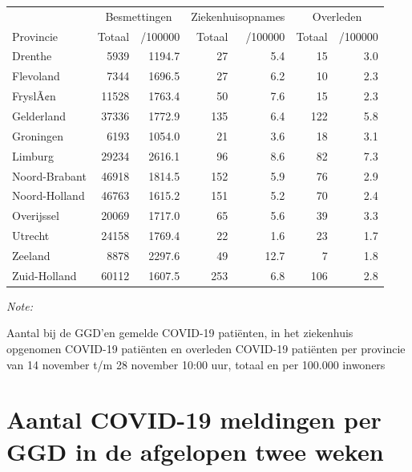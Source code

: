 \documentclass[
  english,
  man,floatsintext]{apa6}
\begin{document}
\begin{table}
\centering
\begin{threeparttable}
\begin{tabular}{lrrrrrr}
\toprule
\multicolumn{1}{c}{ } & \multicolumn{2}{c}{Besmettingen} & \multicolumn{2}{c}{Ziekenhuisopnames} & \multicolumn{2}{c}{Overleden} \\
\cmidrule(l{3pt}r{3pt}){2-3} \cmidrule(l{3pt}r{3pt}){4-5} \cmidrule(l{3pt}r{3pt}){6-7}
Provincie & Totaal & /100000 & Totaal & /100000 & Totaal & /100000\\
\midrule
Drenthe & 5939 & 1194.7 & 27 & 5.4 & 15 & 3.0\\
Flevoland & 7344 & 1696.5 & 27 & 6.2 & 10 & 2.3\\
FryslÃ¢n & 11528 & 1763.4 & 50 & 7.6 & 15 & 2.3\\
Gelderland & 37336 & 1772.9 & 135 & 6.4 & 122 & 5.8\\
Groningen & 6193 & 1054.0 & 21 & 3.6 & 18 & 3.1\\
Limburg & 29234 & 2616.1 & 96 & 8.6 & 82 & 7.3\\
Noord-Brabant & 46918 & 1814.5 & 152 & 5.9 & 76 & 2.9\\
Noord-Holland & 46763 & 1615.2 & 151 & 5.2 & 70 & 2.4\\
Overijssel & 20069 & 1717.0 & 65 & 5.6 & 39 & 3.3\\
Utrecht & 24158 & 1769.4 & 22 & 1.6 & 23 & 1.7\\
Zeeland & 8878 & 2297.6 & 49 & 12.7 & 7 & 1.8\\
Zuid-Holland & 60112 & 1607.5 & 253 & 6.8 & 106 & 2.8\\
\bottomrule
\end{tabular}
\begin{tablenotes}
\item \textit{Note: } 
\item Aantal bij de GGD’en gemelde COVID-19 patiënten, in het ziekenhuis opgenomen COVID-19 patiënten en overleden COVID-19 patiënten per provincie van 14 november t/m 28 november 10:00 uur, totaal en per 100.000 inwoners
\end{tablenotes}
\end{threeparttable}
\end{table}

\newpage

\hypertarget{aantal-covid-19-meldingen-per-ggd-in-de-afgelopen-twee-weken}{%
\section{Aantal COVID-19 meldingen per GGD in de afgelopen twee weken}\label{aantal-covid-19-meldingen-per-ggd-in-de-afgelopen-twee-weken}}
\end{document}
